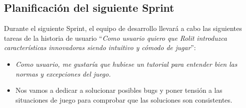 \documentclass[../../FINAL/Scrum/SCRUM.tex]{subfiles}
\begin{document}
\subsection{Planificación del siguiente Sprint}
Durante el siguiente Sprint, el equipo de desarrollo llevará a cabo las siguientes tareas de la historia de usuario ``\textit{Como usuario quiero que Rolit introduzca características innovadoras siendo intuitivo y cómodo de jugar}'':
\begin{itemize}
\item \textit{Como usuario, me gustaría que hubiese un tutorial para entender bien las normas y excepciones del juego.}
\item Nos vamos a dedicar a solucionar posibles bugs y poner tensión a las situaciones de juego para comprobar que las soluciones son consistentes.
\end{itemize}
\end{document}
